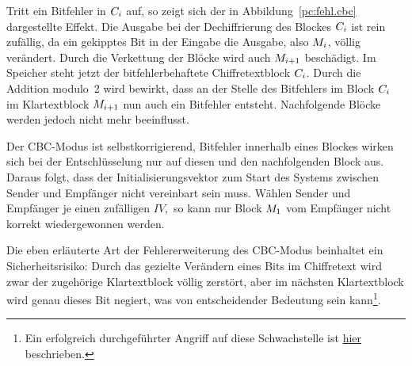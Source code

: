 Tritt ein Bitfehler in $C_i$ auf, so zeigt sich der in Abbildung~\ref{pc:fehl.cbc} dargestellte Effekt. Die Ausgabe bei der Dechiffrierung des Blockes $C_i$
ist rein zufällig, da ein gekipptes Bit in der Eingabe die Ausgabe, also $M_i$, völlig verändert.
Durch die Verkettung der Blöcke wird auch $M_{i+1}$ beschädigt. Im Speicher steht jetzt der bitfehlerbehaftete Chiffretextblock $C_i$.
Durch die Addition modulo~2  wird bewirkt, dass an der Stelle des Bitfehlers im Block $C_i$ im Klartextblock $M_{i+1}$ nun auch ein Bitfehler entsteht. 
Nachfolgende Blöcke werden jedoch nicht mehr beeinflusst.

Der CBC-Modus ist selbstkorrigierend, Bitfehler innerhalb eines Blockes wirken sich bei der Entschlüsselung nur auf diesen und den nachfolgenden
Block aus. Daraus folgt, dass der Initialisierungsvektor zum Start des Systems zwischen Sender und Empfänger nicht vereinbart sein muss. Wählen Sender und
Empfänger je einen zufälligen $IV,$ so kann nur Block $M_1$ vom Empfänger nicht korrekt wiedergewonnen werden.

Die eben erläuterte Art der Fehlererweiterung des CBC-Modus beinhaltet ein Sicherheitsrisiko: Durch das gezielte Verändern eines Bits im Chiffretext wird zwar
der zugehörige Klartextblock völlig zerstört, aber im nächsten Klartextblock wird genau dieses Bit negiert, was von entscheidender Bedeutung sein kann\footnote{Ein erfolgreich durchgeführter Angriff auf diese Schwachstelle ist  \href{http://www.jakoblell.com/blog/2013/12/22/practical-malleability-attack-against-cbc-encrypted-luks-partitions/}{hier} beschrieben.}.

